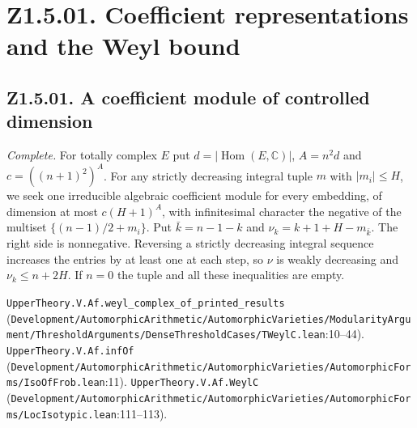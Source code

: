 \section*{Z1.5.01. Coefficient representations and the Weyl bound}

\subsection{Z1.5.01. A coefficient module of controlled dimension}
\label{r5:small:Z1.5.01}
\textit{Complete.} For totally complex $E$ put $d=|\operatorname{Hom}(E,\mathbb C)|$, $A=n^2d$ and $c=((n+1)^2)^A$. For any strictly decreasing integral tuple $m$ with $|m_i|\le H$, we seek one irreducible algebraic coefficient module for every embedding, of dimension at most $c(H+1)^A$, with infinitesimal character the negative of the multiset $\{(n-1)/2+m_i\}$. Put $\bar k=n-1-k$ and $\nu_k=k+1+H-m_{\bar k}$. The right side is nonnegative. Reversing a strictly decreasing integral sequence increases the entries by at least one at each step, so $\nu$ is weakly decreasing and $\nu_k\le n+2H$. If $n=0$ the tuple and all these inequalities are empty.
\par{\footnotesize \nolinkurl{UpperTheory.V.Af.weyl_complex_of_printed_results} (\nolinkurl{Development/AutomorphicArithmetic/AutomorphicVarieties/ModularityArgument/ThresholdArguments/DenseThresholdCases/TWeylC.lean}\allowbreak:10--44). \nolinkurl{UpperTheory.V.Af.infOf} (\nolinkurl{Development/AutomorphicArithmetic/AutomorphicVarieties/AutomorphicForms/IsoOfFrob.lean}\allowbreak:11). \nolinkurl{UpperTheory.V.Af.WeylC} (\nolinkurl{Development/AutomorphicArithmetic/AutomorphicVarieties/AutomorphicForms/LocIsotypic.lean}\allowbreak:111--113).\par}

